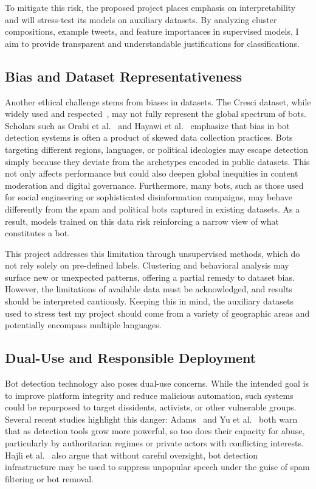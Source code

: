\documentclass[10pt,twocolumn]{article}
\begin{document}
To mitigate this risk, the proposed project places emphasis on interpretability and will stress-test its models on auxiliary datasets. By analyzing cluster compositions, example tweets, and feature importances in supervised models, I aim to provide transparent and understandable justifications for classifications.

\subsection{Bias and Dataset Representativeness}

Another ethical challenge stems from biases in datasets. The Cresci dataset, while widely used and respected~\cite{cresci2017paradigm}, may not fully represent the global spectrum of bots. Scholars such as Orabi et al.~\cite{Orabi2020detection} and Hayawi et al.~\cite{Hayawi2023social} emphasize that bias in bot detection systems is often a product of skewed data collection practices. Bots targeting different regions, languages, or political ideologies may escape detection simply because they deviate from the archetypes encoded in public datasets. This not only affects performance but could also deepen global inequities in content moderation and digital governance. Furthermore, many bots, such as those used for social engineering or sophisticated disinformation campaigns, may behave differently from the spam and political bots captured in existing datasets. As a result, models trained on this data risk reinforcing a narrow view of what constitutes a bot.  

This project addresses this limitation through unsupervised methods, which do not rely solely on pre-defined labels. Clustering and behavioral analysis may surface new or unexpected patterns, offering a partial remedy to dataset bias. However, the limitations of available data must be acknowledged, and results should be interpreted cautiously. Keeping this in mind, the auxiliary datasets used to stress test my project should come from a variety of geographic areas and potentially encompass multiple languages.

\subsection{Dual-Use and Responsible Deployment}

Bot detection technology also poses dual-use concerns. While the intended goal is to improve platform integrity and reduce malicious automation, such systems could be repurposed to target dissidents, activists, or other vulnerable groups. Several recent studies highlight this danger: Adams~\cite{Adams2017ai} and Yu et al.~\cite{Yu2024the} both warn that as detection tools grow more powerful, so too does their capacity for abuse, particularly by authoritarian regimes or private actors with conflicting interests. Hajli et al.~\cite{Hajli2021social} also argue that without careful oversight, bot detection infrastructure may be used to suppress unpopular speech under the guise of spam filtering or bot removal.
\end{document}
